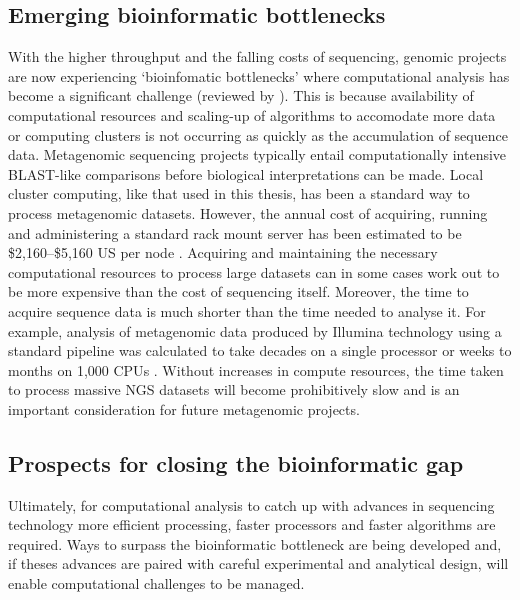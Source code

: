 \subsection{Emerging bioinformatic bottlenecks}
With the higher throughput and the falling costs of sequencing, genomic projects are now experiencing `bioinfomatic bottlenecks' where computational analysis has become a significant challenge (reviewed by \citet{Scholz2012}).
This is because availability of computational resources and scaling-up of algorithms to accomodate more data or computing clusters is not occurring as quickly as the accumulation of sequence data.
Metagenomic sequencing projects typically entail computationally intensive \acs{BLAST}-like comparisons before biological interpretations can be made.
Local cluster computing, like that used in this thesis, has been a standard way to process metagenomic datasets.
However, the annual cost of acquiring, running and administering a standard rack mount server has been estimated to be \$2,160--\$5,160 US per node \cite{Wilkening2009}.
Acquiring and maintaining the necessary computational resources to process large datasets can in some cases work out to be more expensive than the cost of sequencing itself.
Moreover, the time to acquire sequence data is much shorter than the time needed to analyse it.
For example, analysis of metagenomic data produced by Illumina technology using a standard pipeline was calculated to take decades on a single processor or weeks to months on 1,000 \acs{CPU}s \cite{Evanko2009}.
Without increases in compute resources, the time taken to process massive \ac{NGS} datasets will become prohibitively slow and is an important consideration for future metagenomic projects.

\subsection{Prospects for closing the bioinformatic gap}
Ultimately, for computational analysis to catch up with advances in sequencing technology more efficient processing, faster processors and faster algorithms are required.
Ways to surpass the bioinformatic bottleneck are being developed and, if theses advances are paired with careful experimental and analytical design, will enable computational challenges to be managed.

